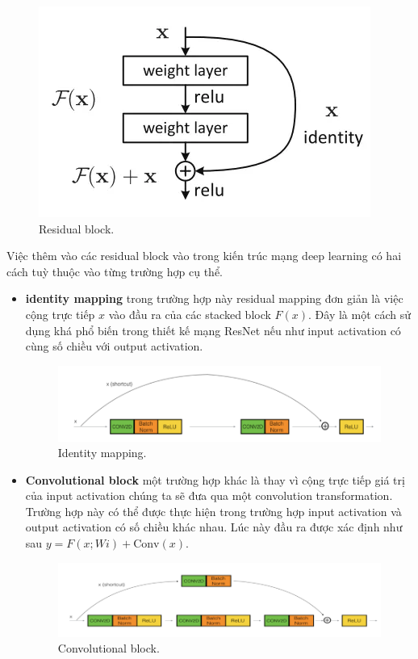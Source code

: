 \begin{figure}[H]
	\centering
	\includegraphics[width=0.5\linewidth]{images/resnet_residual_block}
	\caption{Residual block.}
	\label{fig:resnet_residual_block}
\end{figure}
Việc thêm vào các residual block vào trong kiến trúc mạng deep learning có hai cách tuỳ thuộc vào từng trường hợp cụ thể.
\begin{itemize}
	\item {\bf identity mapping} trong trường hợp này residual mapping đơn giản là việc cộng trực tiếp $x$ vào đầu ra của các stacked block $F(x)$. Đây là một cách sử dụng khá phổ biến trong thiết kế mạng ResNet nếu như input activation có cùng số chiều với output activation.
	\begin{figure}[H]
		\centering
		\includegraphics[width=1\linewidth]{images/resnet_identity_mapping}
		\caption{Identity mapping.}
		\label{fig:resnet_identity_mapping}
	\end{figure}
	\item {\bf Convolutional block} một trường hợp khác là thay vì cộng trực tiếp giá trị của input activation chúng ta sẽ đưa qua một convolution transformation. Trường hợp này có thể được thực hiện trong trường hợp input activation và output activation có số chiều khác nhau. Lúc này đầu ra được xác định như sau $y=F(x;Wi)+\text{Conv}(x)$.
	\begin{figure}[H]
		\centering
		\includegraphics[width=1\linewidth]{images/resnet_conv_block}
		\caption{Convolutional block.}
		\label{fig:resnet_conv_block}
	\end{figure}
\end{itemize}
